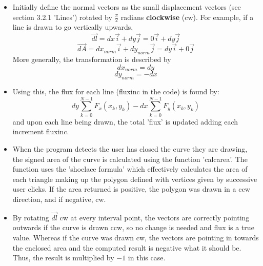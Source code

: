 \documentclass[12pt]{report}
\begin{document}
\begin{itemize}
	\item Initially define the normal vectors as the small displacement vectors (see section 3.2.1 'Lines') rotated by $\frac{\pi}{2}$ radians \textbf{clockwise} (cw). For example, if a line is drawn to go vertically upwards, $$\vec{dl} = dx\vec{i} + dy\vec{j} = 0\vec{i} + dy\vec{j}$$ $$\vec{dA} = dx_{norm}\vec{i} + dy_{norm}\vec{j} = dy\vec{i} + 0\vec{j}$$ More generally, the transformation is described by $$dx_{norm} = dy$$ $$dy_{norm} = -dx$$
	\item Using this, the flux for each line (flux\textunderscore inc in the code) is found by: $$dy \sum_{k=0}^{N-1} F_x(x_k,y_k) - dx \sum_{k=0}^{N-1} F_y(x_k,y_k)$$ and upon each line being drawn, the total 'flux' is updated adding each increment flux\textunderscore inc.
	\item When the program detects the user has closed the curve they are drawing, the signed area of the curve is calculated using the function 'calc\textunderscore area'. The function uses the 'shoelace formula' which effectively calculates the area of each triangle making up the polygon defined with vertices given by successive user clicks. If the area returned is positive, the polygon was drawn in a ccw direction, and if negative, cw. 
	\item By rotating $\vec{dl}$ cw at every interval point, the vectors are correctly pointing outwards if the curve is drawn ccw, so no change is needed and flux is a true value. Whereas if the curve was drawn cw, the vectors are pointing in towards the enclosed area and the computed result is negative what it should be. Thus, the result is multiplied by $-1$ in this case. 
\end{itemize}
\end{document}
